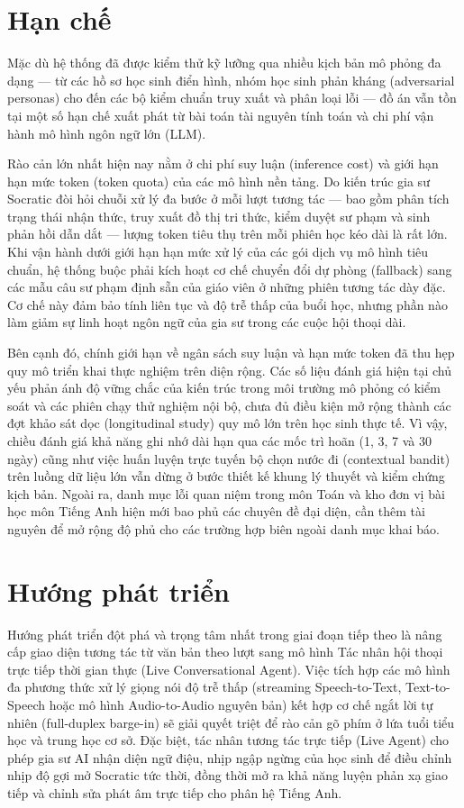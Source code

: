 \section*{Hạn chế}
Mặc dù hệ thống đã được kiểm thử kỹ lưỡng qua nhiều kịch bản mô phỏng đa dạng — từ các hồ sơ học sinh điển hình, nhóm học sinh phản kháng (adversarial personas) cho đến các bộ kiểm chuẩn truy xuất và phân loại lỗi — đồ án vẫn tồn tại một số hạn chế xuất phát từ bài toán tài nguyên tính toán và chi phí vận hành mô hình ngôn ngữ lớn (LLM).

Rào cản lớn nhất hiện nay nằm ở chi phí suy luận (inference cost) và giới hạn hạn mức token (token quota) của các mô hình nền tảng. Do kiến trúc gia sư Socratic đòi hỏi chuỗi xử lý đa bước ở mỗi lượt tương tác — bao gồm phân tích trạng thái nhận thức, truy xuất đồ thị tri thức, kiểm duyệt sư phạm và sinh phản hồi dẫn dắt — lượng token tiêu thụ trên mỗi phiên học kéo dài là rất lớn. Khi vận hành dưới giới hạn hạn mức xử lý của các gói dịch vụ mô hình tiêu chuẩn, hệ thống buộc phải kích hoạt cơ chế chuyển đổi dự phòng (fallback) sang các mẫu câu sư phạm định sẵn của giáo viên ở những phiên tương tác dày đặc. Cơ chế này đảm bảo tính liên tục và độ trễ thấp của buổi học, nhưng phần nào làm giảm sự linh hoạt ngôn ngữ của gia sư trong các cuộc hội thoại dài.

Bên cạnh đó, chính giới hạn về ngân sách suy luận và hạn mức token đã thu hẹp quy mô triển khai thực nghiệm trên diện rộng. Các số liệu đánh giá hiện tại chủ yếu phản ánh độ vững chắc của kiến trúc trong môi trường mô phỏng có kiểm soát và các phiên chạy thử nghiệm nội bộ, chưa đủ điều kiện mở rộng thành các đợt khảo sát dọc (longitudinal study) quy mô lớn trên học sinh thực tế. Vì vậy, chiều đánh giá khả năng ghi nhớ dài hạn qua các mốc trì hoãn (1, 3, 7 và 30 ngày) cũng như việc huấn luyện trực tuyến bộ chọn nước đi (contextual bandit) trên luồng dữ liệu lớn vẫn dừng ở bước thiết kế khung lý thuyết và kiểm chứng kịch bản. Ngoài ra, danh mục lỗi quan niệm trong môn Toán và kho đơn vị bài học môn Tiếng Anh hiện mới bao phủ các chuyên đề đại diện, cần thêm tài nguyên để mở rộng độ phủ cho các trường hợp biên ngoài danh mục khai báo.

\section*{Hướng phát triển}
Hướng phát triển đột phá và trọng tâm nhất trong giai đoạn tiếp theo là nâng cấp giao diện tương tác từ văn bản theo lượt sang mô hình Tác nhân hội thoại trực tiếp thời gian thực (Live Conversational Agent). Việc tích hợp các mô hình đa phương thức xử lý giọng nói độ trễ thấp (streaming  Speech-to-Text, Text-to-Speech hoặc mô hình Audio-to-Audio nguyên bản) kết hợp cơ chế ngắt lời tự nhiên (full-duplex barge-in) sẽ giải quyết triệt để rào cản gõ phím ở lứa tuổi tiểu học và trung học cơ sở. Đặc biệt, tác nhân tương tác trực tiếp (Live Agent) cho phép gia sư AI nhận diện ngữ điệu, nhịp ngập ngừng của học sinh để điều chỉnh nhịp độ gợi mở Socratic tức thời, đồng thời mở ra khả năng luyện phản xạ giao tiếp và chỉnh sửa phát âm trực tiếp cho phân hệ Tiếng Anh. 

